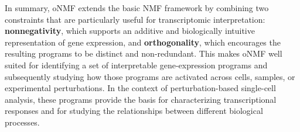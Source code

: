 \documentclass[11pt,a4paper]{article}
\begin{document}
In summary, oNMF extends the basic NMF framework by combining two constraints that are particularly useful for transcriptomic interpretation: \textbf{nonnegativity}, which supports an additive and biologically intuitive representation of gene expression, and \textbf{orthogonality}, which encourages the resulting programs to be distinct and non-redundant. This makes oNMF well suited for identifying a set of interpretable gene-expression programs and subsequently studying how those programs are activated across cells, samples, or experimental perturbations. In the context of perturbation-based single-cell analysis, these programs provide the basis for characterizing transcriptional responses and for studying the relationships between different biological processes.

\newpage

%
%
%
%
%
%
%
%
%
%
%
%
%
\end{document}
